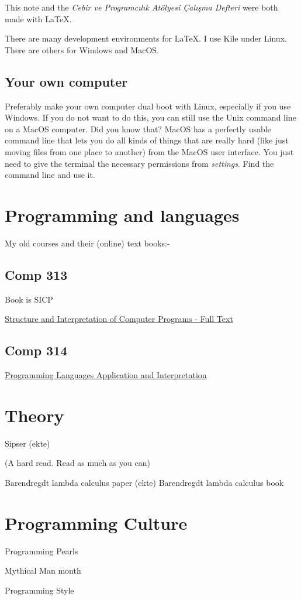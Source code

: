 \documentclass[a4paper,10pt]{article}
\begin{document}
This note and the \textit{Cebir ve Programcılık Atölyesi Çalışma Defteri} were both made with \LaTeX.

There are many development environments for \LaTeX. I use Kile under Linux. There are others for Windows and MacOS.  

\subsection{Your own computer}
Preferably make your own computer dual boot with Linux, especially if you use Windows. If you do not want to do this, you can still use the Unix command line on a MacOS computer. Did you know that? MacOS has a perfectly usable command line that lets you do all kinds of things that are really hard (like just moving files from one place to another) from the MacOS user interface. You just need to give the terminal the necessary permissions from \textit{settings}. Find the command line and use it.  

\section{Programming and languages}

My old courses and their (online) text books:-

\subsection{Comp 313}
Book is SICP

\href{https://mitp-content-server.mit.edu/books/content/sectbyfn/books_pres_0/6515/sicp.zip/full-text/book/book.html}{Structure and Interpretation of Computer Programs - Full Text}
\subsection{Comp 314}
\href{https://www.plai.org/}{Programming Languages Application and Interpretation}
\section{Theory}

Sipser (ekte)

(A hard read. Read as much as you can) 

Barendregdt lambda calculus paper (ekte)
Barendregdt lambda calculus book


\section{Programming Culture}
Programming Pearls

Mythical Man month

Programming Style
\end{document}
